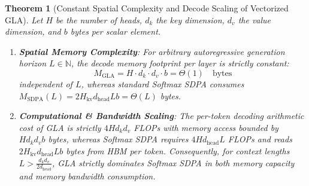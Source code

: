 \documentclass[10pt,twocolumn,letterpaper]{article}
\newtheorem{theorem}{Theorem}
\begin{document}
\begin{theorem}[Constant Spatial Complexity and Decode Scaling of Vectorized GLA]
\label{thm:gla_memory}
Let $H$ be the number of heads, $d_k$ the key dimension, $d_v$ the value dimension, and $b$ bytes per scalar element.
\begin{enumerate}
    \item \textbf{Spatial Memory Complexity}: For arbitrary autoregressive generation horizon $L \in \mathbb{N}$, the decode memory footprint per layer is strictly constant:
    \begin{equation}
        M_{\text{GLA}} = H \cdot d_k \cdot d_v \cdot b = \Theta(1) \quad \text{bytes}
    \end{equation}
    independent of $L$, whereas standard Softmax SDPA consumes $M_{\text{SDPA}}(L) = 2 H_{\text{kv}} d_{\text{head}} L b = \Theta(L)$ bytes.
    \item \textbf{Computational \& Bandwidth Scaling}: The per-token decoding arithmetic cost of GLA is strictly $4 H d_k d_v$ FLOPs with memory access bounded by $H d_k d_v b$ bytes, whereas Softmax SDPA requires $4 H d_{\text{head}} L$ FLOPs and reads $2 H_{\text{kv}} d_{\text{head}} L b$ bytes from HBM per token.
    Consequently, for context lengths $L > \frac{d_k d_v}{2 d_{\text{head}}}$, GLA strictly dominates Softmax SDPA in both memory capacity and memory bandwidth consumption.
\end{enumerate}
\end{theorem}
\end{document}
